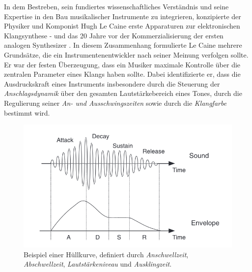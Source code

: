 \documentclass[
  a4paper,  %
  twoside,  %
  bibliography=totoc,
  headsepline,
  cleardoublepage=empty,
  parskip=half,
  draft=false
]{scrbook}
\begin{document}
{In dem Bestreben, sein fundiertes wissenschaftliches Verständnis und seine Expertise in den Bau musikalischer Instrumente zu integrieren, konzipierte der Physiker und Komponist Hugh Le Caine erste Apparaturen zur elektronischen Klangsynthese - und das 20 Jahre vor der Kommerzialisierung der ersten analogen Synthesizer \cite{young_gale_hugh_2013}. In diesem Zusammenhang formulierte Le Caine mehrere Grundsätze, die ein Instrumentenentwickler nach seiner Meinung verfolgen sollte. Er war der festen Überzeugung, dass ein Musiker maximale Kontrolle über die zentralen Parameter eines Klangs haben sollte. Dabei identifizierte er, dass die Ausdruckskraft eines Instruments insbesondere durch die Steuerung der \emph{Anschlagsdynamik} über den gesamten Lautstärkebereich eines Tones, durch die Regulierung seiner \emph{An- und Ausschwingszeiten} sowie durch die \emph{Klangfarbe} bestimmt wird. \cite{ruschkowski_elektronische_2019}

\begin{figure}[h]
  \centering
  \includegraphics[width=.7\textwidth]{graphics/ADSR.png}
  \caption[Hüllkurve]{Beispiel einer Hüllkurve, definiert durch \emph{Anschwellzeit}, \emph{Abschwellzeit}, \emph{Lautstärkeniveau} und \emph{Ausklingzeit}. \cite{russ_sound_2009}}
  \label{fig:adsr}
\end{figure}

}
\end{document}
